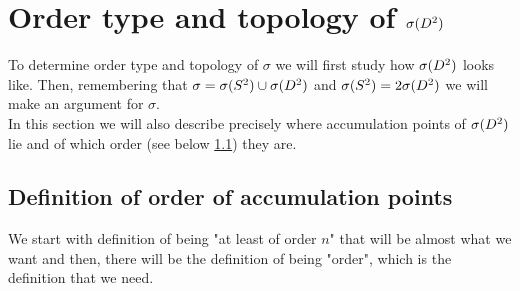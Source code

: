 \section{Order type and topology of ${\mathcal{\sigma}(D^2)}$}
To determine order type and topology of $\sigma$ we will first study how ${\mathcal{\sigma}(D^2)}$ looks like. 
Then, remembering that 
$\sigma = {\mathcal{\sigma}(S^2)} \cup {\mathcal{\sigma}(D^2)}$ and ${\mathcal{\sigma}(S^2)} = 2{\mathcal{\sigma}(D^2)}$ we will make an argument for $\sigma$. \\
In this section we will also describe precisely where accumulation points of ${\mathcal{\sigma}(D^2)}$ lie and of 
 which order 
(see below \ref{accumulation_points_definitions}) they are. \\
\subsection{Definition of order of accumulation points}
\label{accumulation_points_definitions} 
We start with definition of being "at least of order $n$" that will be almost what we want
and then, there will be the definition of being "order", which is the definition that we need. \\
